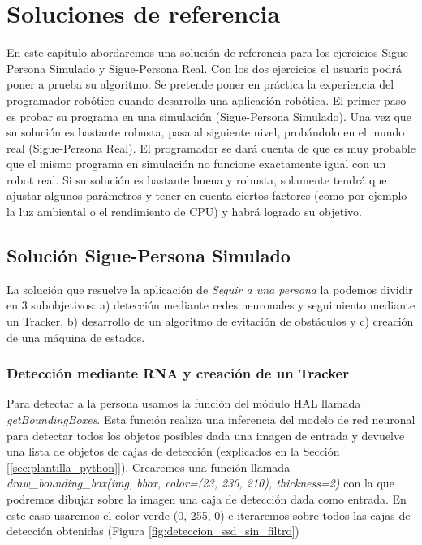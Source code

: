 \chapter{Soluciones de referencia}
\label{cap:capitulo6}

En este capítulo abordaremos una solución de referencia para los ejercicios Sigue-Persona Simulado y Sigue-Persona Real. Con los dos ejercicios el usuario podrá poner a prueba su algoritmo. Se pretende poner en práctica la experiencia del programador robótico cuando desarrolla una aplicación robótica. El primer paso es probar su programa en una simulación (Sigue-Persona Simulado). Una vez que su solución es bastante robusta, pasa al siguiente nivel, probándolo en el mundo real (Sigue-Persona Real). El programador se dará cuenta de que es muy probable que el mismo programa en simulación no funcione exactamente igual con un robot real. Si su solución es bastante buena y robusta, solamente tendrá que ajustar algunos parámetros y tener en cuenta ciertos factores (como por ejemplo la luz ambiental o el rendimiento de CPU) y habrá logrado su objetivo.\\

\section{Solución Sigue-Persona Simulado}
\label{sec:solucion_sigue_personas_simulado}

La solución que resuelve la aplicación de \textit{Seguir a una persona} la podemos dividir en 3 subobjetivos: a) detección mediante redes neuronales y seguimiento mediante un Tracker, b) desarrollo de un algoritmo de evitación de obstáculos y c) creación de una máquina de estados.\\



\subsection{Detección mediante RNA y creación de un Tracker}
\label{subsec:ml_tracker}
Para detectar a la persona usamos la función del módulo HAL llamada \textit{getBoundingBoxes}. Esta función realiza una inferencia del modelo de red neuronal para detectar todos los objetos posibles dada una imagen de entrada y devuelve una lista de objetos de cajas de detección (explicados en la Sección [\ref{sec:plantilla_python}]). Crearemos una función llamada \textit{draw\_bounding\_box(img, bbox, color=(23, 230, 210), thickness=2)} con la que podremos dibujar sobre la imagen una caja de detección dada como entrada. En este caso usaremos el color verde (0, 255, 0) e iteraremos sobre todos las cajas de detección obtenidas (Figura \ref{fig:deteccion_ssd_sin_filtro})\\

